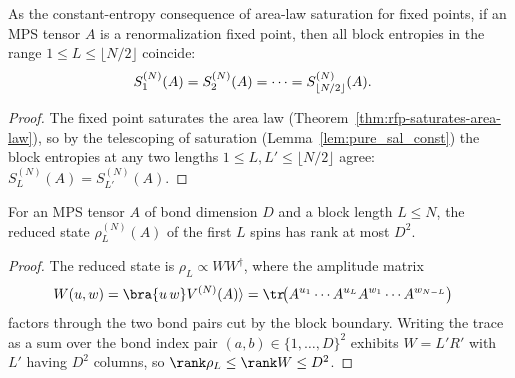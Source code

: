 \begin{corollary}
    \label{thm:rfp_constant_entropy}
    \leanok
    As the constant-entropy consequence of area-law saturation
    \cite[Definition~3.13, line~600]{Cirac2016MPDO_arXiv} for fixed points, if an
    MPS tensor $A$ is a renormalization fixed point, then all block entropies
    in the range $1\le L\le\lfloor N/2\rfloor$ coincide:
    \begin{align}
        S_1^{(N)}(A)
         & =S_2^{(N)}(A)
        =\cdots
        =S_{\lfloor N/2\rfloor}^{(N)}(A).
        \notag
    \end{align}
\end{corollary}
\begin{proof}\leanok
    The fixed point saturates the area law
    (Theorem~\ref{thm:rfp-saturates-area-law}), so by the telescoping of
    saturation (Lemma~\ref{lem:pure_sal_const}) the block entropies at any two
    lengths $1\le L,L'\le\lfloor N/2\rfloor$ agree:
    $S_L^{(N)}(A)=S_{L'}^{(N)}(A)$.
\end{proof}

\begin{lemma}\label{lem:operator_schmidt_rank}
    \leanok
    For an MPS tensor $A$ of bond dimension $D$ and a block length $L\le N$, the
    reduced state $\rho_L^{(N)}(A)$ of the first $L$ spins has rank at most $D^2$.
\end{lemma}
\begin{proof}\leanok
    The reduced state is $\rho_L\propto WW^\dagger$, where the amplitude matrix
    \begin{align}
        W(u,w)
         & =
        \bra{u\,w}V^{(N)}(A)\rangle
        =
        \tr\!\bigl(      A^{u_1}\cdots A^{u_L}
        A^{w_1}\cdots A^{w_{N-L}}
        \bigr)
        \notag
    \end{align}
    factors through the two bond pairs cut by the block boundary. Writing the
    trace as a sum over the bond index pair
    $(a,b)\in\{1,\ldots,D\}^2$ exhibits $W=L'R'$ with $L'$ having $D^2$
    columns, so $\rank\rho_L\leq\rank W\leq D^2$.
\end{proof}

